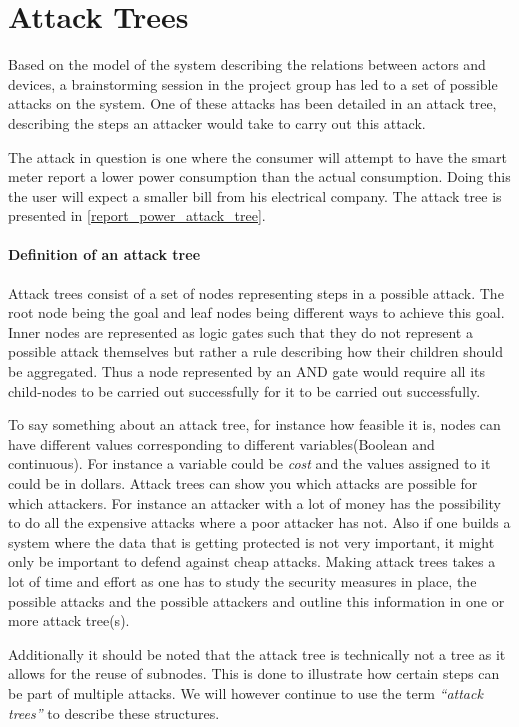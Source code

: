 \section{Attack Trees}
Based on the model of the system describing the relations between actors and devices, a brainstorming session in the project group has led to a set of possible attacks on the system.
One of these attacks has been detailed in an attack tree, describing the steps an attacker would take to carry out this attack.

The attack in question is one where the consumer will attempt to have the smart meter report a lower power consumption than the actual consumption.
Doing this the user will expect a smaller bill from his electrical company.
The attack tree is presented in \cref{report_power_attack_tree}.

\paragraph{Definition of an attack tree}
Attack trees consist of a set of nodes representing steps in a possible attack.
The root node being the goal and leaf nodes being different ways to achieve this goal.
Inner nodes are represented as logic gates such that they do not represent a possible attack themselves but rather a rule describing how their children should be aggregated.
Thus a node represented by an AND gate would require all its child-nodes to be carried out successfully for it to be carried out successfully.

To say something about an attack tree, for instance how feasible it is, nodes can have different values corresponding to different variables(Boolean and continuous).
For instance a variable could be \textit{cost} and the values assigned to it could be in dollars.
Attack trees can show you which attacks are possible for which attackers.
For instance an attacker with a lot of money has the possibility to do all the expensive attacks where a poor attacker has not.
Also if one builds a system where the data that is getting protected is not very important, it might only be important to defend against cheap attacks.
Making attack trees takes a lot of time and effort as one has to study the security measures in place, the possible attacks and the possible attackers and outline this information in one or more attack tree(s).\cite{schneier_attack_trees}

Additionally it should be noted that the attack tree is technically not a tree as it allows for the reuse of subnodes.
This is done to illustrate how certain steps can be part of multiple attacks.
We will however continue to use the term \emph{``attack trees''} to describe these structures.
